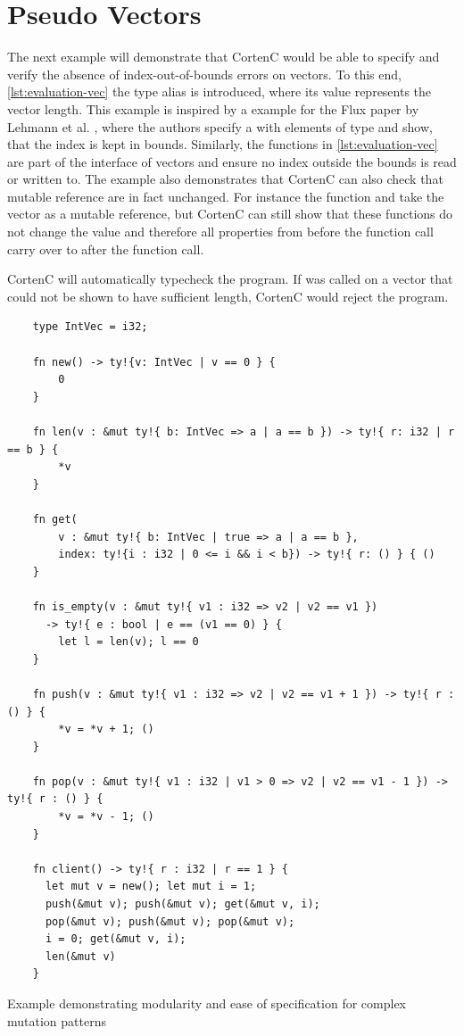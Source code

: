 \documentclass[twoside, english]{sdqthesis}
\theoremstyle{definition}
\begin{document}
\section{Pseudo Vectors}

The next example will demonstrate that CortenC would be able to specify and verify the absence of index-out-of-bounds errors on vectors. To this end, \cref{lst:evaluation-vec} the type alias  is introduced, where its value represents the vector length. This example is inspired by a example for the Flux paper by Lehmann et al. \cite{lehmann_flux_2022}, where the authors specify a  with elements of type  and show, that the index is kept in bounds.
Similarly, the functions in \cref{lst:evaluation-vec} are part of the interface of vectors and ensure no index outside the bounds is read or written to.
The example also demonstrates that CortenC can also check that mutable reference are in fact unchanged. For instance the function  and  take the vector  as a mutable reference, but CortenC can still show that these functions do not change the value and therefore all properties from before the function call carry over to after the function call.

CortenC will automatically typecheck the program. If  was called on a vector that could not be shown to have sufficient length, CortenC would reject the program.

\begin{listing}[h]
  \begin{verbatim}
    type IntVec = i32;

    fn new() -> ty!{v: IntVec | v == 0 } {
        0
    }

    fn len(v : &mut ty!{ b: IntVec => a | a == b }) -> ty!{ r: i32 | r == b } {
        *v
    }

    fn get(
        v : &mut ty!{ b: IntVec | true => a | a == b }, 
        index: ty!{i : i32 | 0 <= i && i < b}) -> ty!{ r: () } { ()
    }

    fn is_empty(v : &mut ty!{ v1 : i32 => v2 | v2 == v1 }) 
      -> ty!{ e : bool | e == (v1 == 0) } {
        let l = len(v); l == 0
    }

    fn push(v : &mut ty!{ v1 : i32 => v2 | v2 == v1 + 1 }) -> ty!{ r : () } {
        *v = *v + 1; ()
    }

    fn pop(v : &mut ty!{ v1 : i32 | v1 > 0 => v2 | v2 == v1 - 1 }) -> ty!{ r : () } {
        *v = *v - 1; ()
    }

    fn client() -> ty!{ r : i32 | r == 1 } {
      let mut v = new(); let mut i = 1;
      push(&mut v); push(&mut v); get(&mut v, i);
      pop(&mut v); push(&mut v); pop(&mut v);
      i = 0; get(&mut v, i);
      len(&mut v)
    }
  \end{verbatim}
  \caption{Example demonstrating modularity and ease of specification for complex mutation patterns}
  \label{lst:evaluation-vec}
\end{listing}
\end{document}
